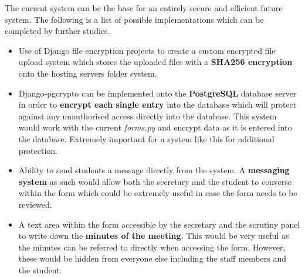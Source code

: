\documentclass[../main.tex]{subfiles}
\begin{document}
\raggedright
The current system can be the base for an entirely secure and efficient future system. The following is a list of possible implementations which can be completed by further studies. 
\begin{itemize}
  \item Use of Django file encryption projects\cite{ruddra}\cite{danielquinn} to create a custom encrypted file upload system which stores the uploaded files with a \textbf{SHA256 encryption} onto the hosting servers folder system. 
  \item Django-pgcrypto\cite{dbencrypt} can be implemented onto the \textbf{PostgreSQL} database server in order to \textbf{encrypt each single entry} into the database which will protect against any unauthorised access directly into the database. This system would work with the current \textit{forms.py} and encrypt data as it is entered into the database. Extremely important for a system like this for additional protection. 
  \item Ability to send students a message directly from the system. A \textbf{messaging system} as such would allow both the secretary and the student to converse within the form which could be extremely useful in case the form needs to be reviewed.
  \item A text area within the form accessible by the secretary and the scrutiny panel to write down the \textbf{minutes of the meeting}. This would be very useful as the minutes can be referred to directly when accessing the form. However, these would be hidden from everyone else including the staff members and the student.  
\end{itemize}
\end{document}
